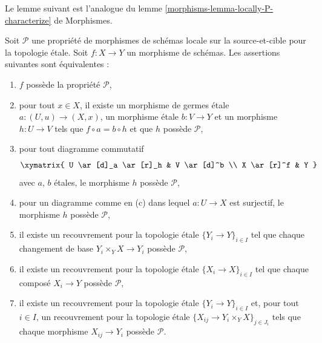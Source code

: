 \noindent
Le lemme suivant est l'analogue du
lemme \ref{morphisms-lemma-locally-P-characterize} de Morphismes.

\begin{lemma}
\label{lemma-local-source-target-characterize}
Soit $\mathcal{P}$ une propriété de morphismes de schémas locale sur la source-et-cible pour la topologie \'etale. Soit $f : X \to Y$ un morphisme de
schémas. Les assertions suivantes sont équivalentes :
\begin{enumerate}
\item[(a)] $f$ possède la propriété $\mathcal{P}$,
\item[(b)] pour tout $x \in X$, il existe un morphisme de germes \'etale
$a : (U, u) \to (X, x)$, un morphisme \'etale $b : V \to Y$ et un morphisme
$h : U \to V$ tels que $f \circ a = b \circ h$ et que $h$ possède
$\mathcal{P}$,
\item[(c)] pour tout diagramme commutatif
$$
\xymatrix{
U \ar[d]_a \ar[r]_h & V \ar[d]^b \\
X \ar[r]^f & Y
}
$$
avec $a$, $b$ étales, le morphisme $h$ possède $\mathcal{P}$,
\item[(d)] pour un diagramme comme en (c) dans lequel $a : U \to X$ est
surjectif, le morphisme $h$ possède $\mathcal{P}$,
\item[(e)] il existe un recouvrement pour la topologie \'etale
$\{Y_i \to Y\}_{i \in I}$ tel
que chaque changement de base $Y_i \times_Y X \to Y_i$ possède
$\mathcal{P}$,
\item[(f)] il existe un recouvrement pour la topologie \'etale
$\{X_i \to X\}_{i \in I}$ tel
que chaque composé $X_i \to Y$ possède $\mathcal{P}$,
\item[(g)] il existe un recouvrement pour la topologie \'etale
$\{Y_i \to Y\}_{i \in I}$ et, pour tout $i \in I$, un recouvrement pour la
topologie \'etale
$\{X_{ij} \to Y_i \times_Y X\}_{j \in J_i}$ tels que chaque morphisme
$X_{ij} \to Y_i$ possède $\mathcal{P}$.
\end{enumerate}
\end{lemma}

